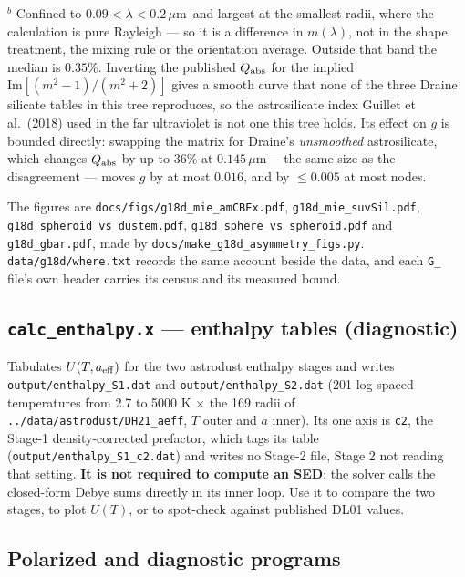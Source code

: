 \documentclass{my_memo}
\newcommand{\code}[1]{\texttt{#1}}
\newcommand{\um}{\ensuremath{\,\mu\mathrm{m}}}
\begin{document}
\noindent $^{b}$ Confined to $0.09 < \lambda < 0.2$\um\ and largest at the
smallest radii, where the calculation is pure Rayleigh --- so it is a
difference in $m(\lambda)$, not in the shape treatment, the mixing rule or the
orientation average. Outside that band the median is $0.35\%$. Inverting the
published $Q_{\rm abs}$ for the implied
$\mathrm{Im}[(m^2-1)/(m^2+2)]$ gives a smooth curve that none of the three
Draine silicate tables in this tree reproduces, so the astrosilicate index
Guillet et al.\ (2018) used in the far ultraviolet is not one this tree holds.
Its effect on $g$ is bounded directly: swapping the matrix for Draine's
\emph{unsmoothed} astrosilicate, which changes $Q_{\rm abs}$ by up to $36\%$ at
$0.145$\um --- the same size as the disagreement --- moves $g$ by at most
$0.016$, and by $\le 0.005$ at most nodes.

\medskip
\noindent The figures are \code{docs/figs/g18d\_mie\_amCBEx.pdf},
\code{g18d\_mie\_suvSil.pdf}, \code{g18d\_spheroid\_vs\_dustem.pdf},
\code{g18d\_sphere\_vs\_spheroid.pdf} and \code{g18d\_gbar.pdf}, made by
\code{docs/make\_g18d\_asymmetry\_figs.py}. \code{data/g18d/where.txt} records
the same account beside the data, and each \code{G\_} file's own header carries
its census and its measured bound.

\subsection{\code{calc\_enthalpy.x} --- enthalpy tables (diagnostic)}

Tabulates $U(T, a_{\rm eff})$ for the two astrodust enthalpy stages and writes
\code{output/enthalpy\_S1.dat} and \code{output/enthalpy\_S2.dat} (201
log-spaced temperatures from 2.7 to 5000 K $\times$ the 169 radii of
\code{../data/astrodust/DH21\_aeff}, $T$ outer and $a$ inner). Its one axis is
\code{c2}, the Stage-1 density-corrected prefactor, which tags its table
(\code{output/enthalpy\_S1\_c2.dat}) and writes no Stage-2 file, Stage 2 not
reading that setting. \textbf{It is not required to compute an SED}: the solver calls the
closed-form Debye sums directly in its inner loop. Use it to compare the two
stages, to plot $U(T)$, or to spot-check against published DL01 values.

\subsection{Polarized and diagnostic programs}
\end{document}
